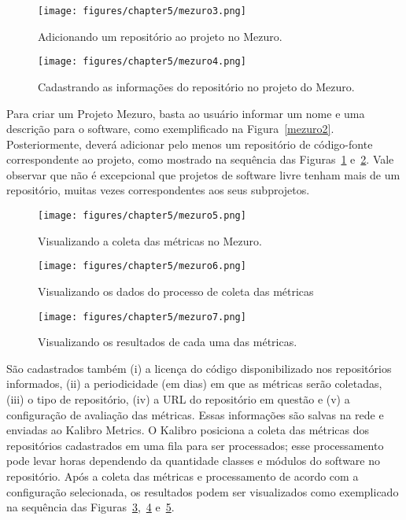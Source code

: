 \begin{figure}[!h]
\centering
\texttt{[image: figures/chapter5/mezuro3.png]}
\caption{Adicionando um repositório ao projeto no Mezuro.}
\label{mezuro3}
\end{figure}

\begin{figure}[!h]
\centering
\texttt{[image: figures/chapter5/mezuro4.png]}
\caption{Cadastrando as informações do repositório no projeto do Mezuro.}
\label{mezuro4}
\end{figure}


Para criar um Projeto Mezuro, basta ao usuário informar um nome e uma descrição para o software,
como exemplificado na Figura~\ref{mezuro2}.
%
Posteriormente, deverá adicionar pelo menos um repositório de código-fonte
correspondente ao projeto, como mostrado na sequência das Figuras~\ref{mezuro3}
e~\ref{mezuro4}. Vale observar que não é excepcional que projetos de software
livre tenham mais de um repositório, muitas vezes correspondentes aos
seus subprojetos.


\begin{figure}[!h]
\centering
\texttt{[image: figures/chapter5/mezuro5.png]}
\caption{Visualizando a coleta das métricas no Mezuro.}
\label{mezuro5}
\end{figure}

\begin{figure}[!h]
\centering
\texttt{[image: figures/chapter5/mezuro6.png]}
\caption{Visualizando os dados do processo de coleta das métricas}
\label{mezuro6}
\end{figure}

\begin{figure}[!h]
\centering
\texttt{[image: figures/chapter5/mezuro7.png]}
\caption{Visualizando os resultados de cada uma das métricas.}
\label{mezuro7}
\end{figure}

São cadastrados também (i) a licença do código disponibilizado nos repositórios
informados, (ii) a periodicidade (em dias) em que as métricas serão coletadas,
(iii) o tipo de repositório, (iv) a URL do repositório em questão e
(v) a configuração de avaliação das métricas. Essas informações
são salvas na rede e enviadas ao Kalibro Metrics.
%
O Kalibro posiciona a coleta das métricas dos repositórios cadastrados em uma fila
para ser processados; esse processamento pode levar horas dependendo da
quantidade classes e módulos do software no repositório.
%
Após a coleta das métricas e processamento de acordo com a configuração
selecionada, os resultados podem ser visualizados como exemplicado na sequência
das Figuras~\ref{mezuro5},~\ref{mezuro6} e~\ref{mezuro7}. 


